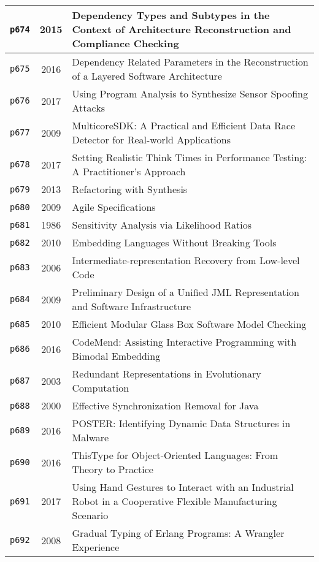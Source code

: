 \begin{longtable}{| c | c | p{16cm} |}
  \hline
  \texttt{p674} & 2015 & Dependency Types and Subtypes in the Context of Architecture Reconstruction and Compliance Checking \\
  \hline
  \texttt{p675} & 2016 & Dependency Related Parameters in the Reconstruction of a Layered Software Architecture \\
  \hline
  \texttt{p676} & 2017 & Using Program Analysis to Synthesize Sensor Spoofing Attacks \\
  \hline
  \texttt{p677} & 2009 & MulticoreSDK: A Practical and Efficient Data Race Detector for Real-world Applications \\
  \hline
  \texttt{p678} & 2017 & Setting Realistic Think Times in Performance Testing: A Practitioner's Approach \\
  \hline
  \texttt{p679} & 2013 & Refactoring with Synthesis \\
  \hline
  \texttt{p680} & 2009 & Agile Specifications \\
  \hline
  \texttt{p681} & 1986 & Sensitivity Analysis via Likelihood Ratios \\
  \hline
  \texttt{p682} & 2010 & Embedding Languages Without Breaking Tools \\
  \hline
  \texttt{p683} & 2006 & Intermediate-representation Recovery from Low-level Code \\
  \hline
  \texttt{p684} & 2009 & Preliminary Design of a Unified JML Representation and Software Infrastructure \\
  \hline
  \texttt{p685} & 2010 & Efficient Modular Glass Box Software Model Checking \\
  \hline
  \texttt{p686} & 2016 & CodeMend: Assisting Interactive Programming with Bimodal Embedding \\
  \hline
  \texttt{p687} & 2003 & Redundant Representations in Evolutionary Computation \\
  \hline
  \texttt{p688} & 2000 & Effective Synchronization Removal for Java \\
  \hline
  \texttt{p689} & 2016 & POSTER: Identifying Dynamic Data Structures in Malware \\
  \hline
  \texttt{p690} & 2016 & ThisType for Object-Oriented Languages: From Theory to Practice \\
  \hline
  \texttt{p691} & 2017 & Using Hand Gestures to Interact with an Industrial Robot in a Cooperative Flexible Manufacturing Scenario \\
  \hline
  \texttt{p692} & 2008 & Gradual Typing of Erlang Programs: A Wrangler Experience \\

\end{longtable}
